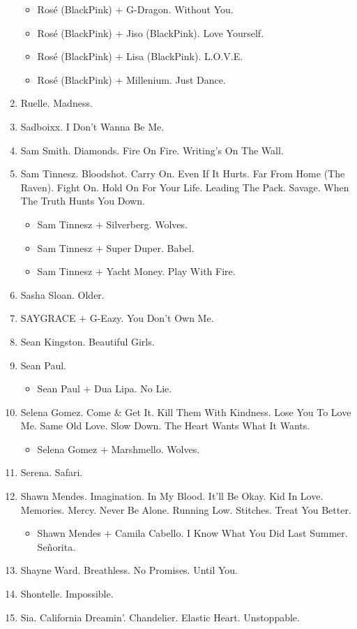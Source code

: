 \documentclass{article}
\begin{document}
\begin{enumerate}
	\begin{itemize}
		\item {\sc Ros\'e (BlackPink) $+$ G-Dragon.} Without You.
		\item {\sc Ros\'e (BlackPink) $+$ Jiso (BlackPink).} Love Yourself.
		\item {\sc Ros\'e (BlackPink) $+$ Lisa (BlackPink).} L.O.V.E.
		\item {\sc Ros\'e (BlackPink) $+$ Millenium.} Just Dance.
	\end{itemize}
	\item {\sc Ruelle.} Madness.
	\item {\sc Sadboixx.} I Don't Wanna Be Me.
	\item {\sc Sam Smith.} Diamonds. Fire On Fire. Writing's On The Wall.
	\item {\sc Sam Tinnesz.} Bloodshot. Carry On. Even If It Hurts. Far From Home (The Raven). Fight On. Hold On For Your Life. Leading The Pack. Savage. When The Truth Hunts You Down.
	\begin{itemize}
		\item {\sc Sam Tinnesz $+$ Silverberg.} Wolves.
		\item {\sc Sam Tinnesz $+$ Super Duper.} Babel.
		\item {\sc Sam Tinnesz $+$ Yacht Money.} Play With Fire.
	\end{itemize}
	\item {\sc Sasha Sloan.} Older.
	\item {\sc SAYGRACE $+$ G-Eazy.} You Don't Own Me.
	\item {\sc Sean Kingston.} Beautiful Girls.
	\item {\sc Sean Paul.}
	\begin{itemize}
		\item {\sc Sean Paul $+$ Dua Lipa.} No Lie.
	\end{itemize}
	\item {\sc Selena Gomez.} Come \& Get It. Kill Them With Kindness. Lose You To Love Me. Same Old Love. Slow Down. The Heart Wants What It Wants.
	\begin{itemize}
		\item {\sc Selena Gomez $+$ Marshmello.} Wolves.
	\end{itemize}
	\item {\sc Serena.} Safari.
	\item {\sc Shawn Mendes.} Imagination. In My Blood. It'll Be Okay. Kid In Love. Memories. Mercy. Never Be Alone. Running Low. Stitches. Treat You Better.
	\begin{itemize}
		\item {\sc Shawn Mendes $+$ Camila Cabello.} I Know What You Did Last Summer. Se\~norita.
	\end{itemize}
	\item {\sc Shayne Ward.} Breathless. No Promises. Until You.
	\item {\sc Shontelle.} Impossible.
	\item {\sc Sia.} California Dreamin'. Chandelier. Elastic Heart. Unstoppable.
	

\end{enumerate}
\end{document}

